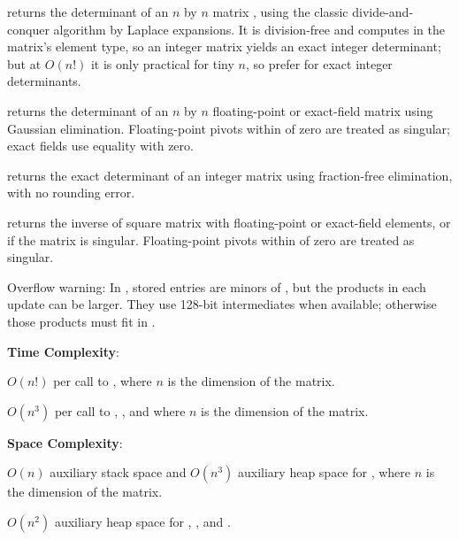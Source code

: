 \begin{compactitem}
  \item {} returns the determinant of an $n$ by $n$ matrix , using the classic divide-and-conquer algorithm by Laplace expansions. It is division-free and computes in the matrix's element type, so an integer matrix yields an exact integer determinant; but at $O(n!)$ it is only practical for tiny $n$, so prefer  for exact integer determinants.
  \item {} returns the determinant of an $n$ by $n$ floating-point or exact-field matrix  using Gaussian elimination. Floating-point pivots within  of zero are treated as singular; exact fields use equality with zero.
  \item {} returns the exact determinant of an integer matrix  using fraction-free elimination, with no rounding error.
  \item {} returns the inverse of square matrix  with floating-point or exact-field elements, or  if the matrix is singular. Floating-point pivots within  of zero are treated as singular.
\end{compactitem}

Overflow warning: In , stored entries are minors of , but the products in each update can be larger. They use 128-bit intermediates when available; otherwise those products must fit in .

\textbf{Time Complexity}:
\begin{compactitem}
  \item $O(n!)$ per call to , where $n$ is the dimension of the matrix.
  \item $O(n^{3})$ per call to , , and  where $n$ is the dimension of the matrix.
\end{compactitem}

\textbf{Space Complexity}:
\begin{compactitem}
  \item $O(n)$ auxiliary stack space and $O(n^{3})$ auxiliary heap space for , where $n$ is the dimension of the matrix.
  \item $O(n^{2})$ auxiliary heap space for , , and .
\end{compactitem}

